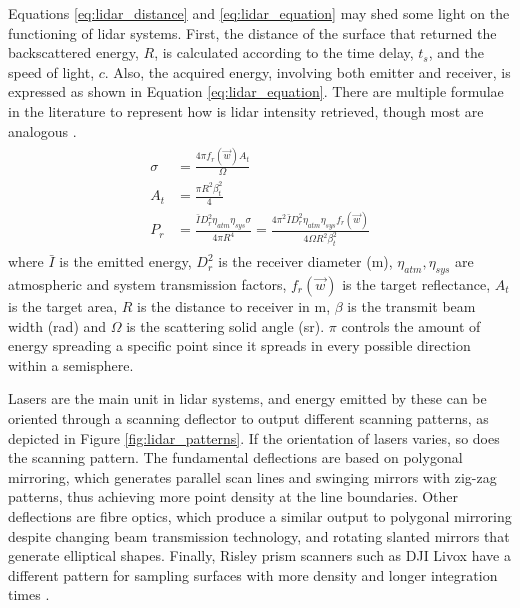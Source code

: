 Equations \ref{eq:lidar_distance} and \ref{eq:lidar_equation} may shed some light on the functioning of \acrshort{lidar} systems. First, the distance of the surface that returned the backscattered energy, $R$, is calculated according to the time delay, $t_s$, and the speed of light, $c$. Also, the acquired energy, involving both emitter and receiver, is expressed as shown in Equation \ref{eq:lidar_equation}. There are multiple formulae in the literature to represent how is \acrshort{lidar} intensity retrieved, though most are analogous \cite{hofle_correction_2007, bolkas_effect_2018, dong_lidar_2018}.
\begin{gather}
    \label{eq:lidar_equation}
    \begin{aligned}
        \sigma &= \frac{4\pi f_{r}(\vec{w})A_{t}}{\Omega}\\
        A_{t} &= \frac{\pi R^{2} \beta^{2}_{t}}{4}\\
        P_{r} &= \frac{\bar{I} D^{2}_{r} \eta_{atm} \eta_{sys} \sigma}{4 \pi R^{4}}=
        \frac{4\pi^2 \bar{I} D^{2}_{r} \eta_{atm} \eta_{sys}  f_{r}(\vec{w})}{4\Omega R^{2} \beta^{2}_{t}}
    \end{aligned}
\end{gather}
where $\bar{I}$ is the emitted energy, $D^{2}_{r}$ is the receiver diameter (\si{\meter}), $\eta_{atm}, \eta_{sys}$ are atmospheric and system transmission factors, $f_{r}(\vec{w})$ is the target reflectance, $A_{t}$ is the target area, $R$ is the distance to receiver in \si{\meter}, $\beta$ is the transmit beam width (\si{\radian}) and $\Omega$ is the scattering solid angle (\si{\steradian}). $\pi$ controls the amount of energy spreading a specific point since it spreads in every possible direction within a semisphere.

Lasers are the main unit in \acrshort{lidar} systems, and energy emitted by these can be oriented through a scanning deflector to output different scanning patterns, as depicted in Figure \ref{fig:lidar_patterns}. If the orientation of lasers varies, so does the scanning pattern. The fundamental deflections are based on polygonal mirroring, which generates parallel scan lines and swinging mirrors with zig-zag patterns, thus achieving more point density at the line boundaries. Other deflections are fibre optics, which produce a similar output to polygonal mirroring despite changing beam transmission technology, and rotating slanted mirrors that generate elliptical shapes. Finally, Risley prism scanners such as DJI Livox have a different pattern for sampling surfaces with more density and longer integration times \cite{bechtold_helios_2016, winiwarter_virtual_2022}.


